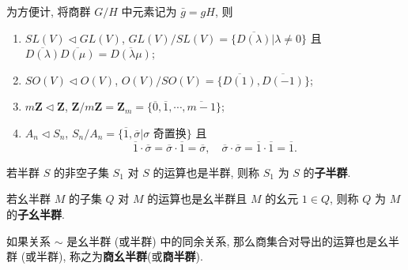 \documentclass[../../main.tex]{subfiles}
\begin{document}
\begin{example}
为方便计, 将商群 \( G/H \) 中元素记为 \( \bar{g} = gH \), 则
\begin{enumerate}[(1)]
\item \( SL(V) \lhd  GL(V) \), \( GL(V)/SL(V) = \{\overline{D(\lambda)}|\lambda \neq 0\} \) 且 \( \overline{D(\lambda)}\overline{D(\mu)} = \overline{D(\lambda\mu)} \);

\item \( SO(V) \lhd  O(V) \), \( O(V)/SO(V) = \{\overline{D(1)}, \overline{D(-1)}\} \);

\item \( m\mathbf{Z} \lhd  \mathbf{Z} \), \( \mathbf{Z}/m\mathbf{Z} = \mathbf{Z}_m = \{\overline{0}, \overline{1}, \cdots, \overline{m-1}\} \);

\item \( A_n \lhd  S_n \), \( S_n/A_n = \{\overline{1}, \overline{\sigma}|\sigma \text{ 奇置换} \} \) 且
\[
\overline{1} \cdot \overline{\sigma} = \overline{\sigma} \cdot \overline{1} = \overline{\sigma}, \quad \overline{\sigma} \cdot \overline{\sigma} = \overline{1} \cdot \overline{1} = \overline{1}.
\]
\end{enumerate}
\end{example}

\begin{definition}
若半群 \( S \) 的非空子集 \( S_1 \) 对 \( S \) 的运算也是半群, 则称 \( S_1 \) 为 \( S \) 的\textbf{子半群}.

若幺半群 \( M \) 的子集 \( Q \) 对 \( M \) 的运算也是幺半群且 \( M \) 的幺元 \( 1 \in Q \), 则称 \( Q \) 为 \( M \) 的\textbf{子幺半群}.

如果关系 \( \sim \) 是幺半群 (或半群) 中的同余关系, 那么商集合对导出的运算也是幺半群 (或半群), 称之为\textbf{商幺半群}(或\textbf{商半群}). 
\end{definition}
\end{document}
